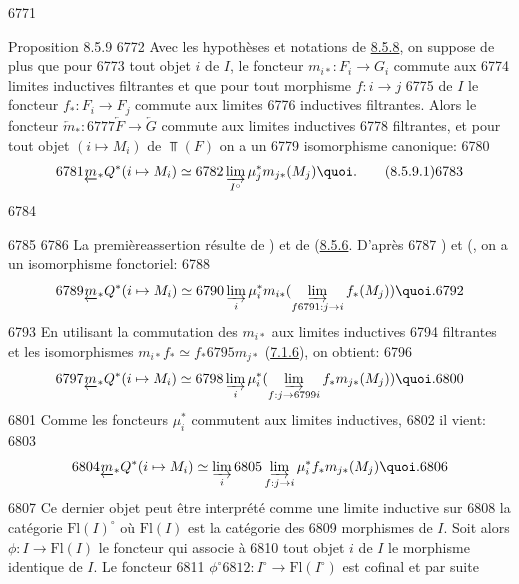   6771	\begin{enonce*}{Proposition 8.5.9}
  6772	Avec les hypothèses et notations de \hyperref[VI.prop8.5.8]{8.5.8}, on suppose de plus que pour
  6773	tout objet $i$ de $I$, le foncteur $m_{i\ast} : F_{i} \to G_i$ commute aux
  6774	limites inductives filtrantes et que pour tout morphisme $f : i \to j$
  6775	de $I$ le foncteur $f_{\ast} : F_i \to F_j$ commute aux limites
  6776	inductives filtrantes. Alors le foncteur $\underleftarrow{m}_{\ast} :
  6777	\underleftarrow{F} \to \underleftarrow{G}$ commute aux limites inductives
  6778	filtrantes, et pour tout objet $(i \mapsto M_i)$ de $\Top(F)$ on a un
  6779	isomorphisme canonique:
  6780	\begin{equation*}
  6781	\underleftarrow{m}_{\ast} Q^{\ast} (i \mapsto M_i) \simeq
  6782	\varinjlim_{I^{\circ}} \mu^{\ast}_j m_{j\ast} (M_j){\quoi}.\tag{8.5.9.1}
  6783	\end{equation*}
  6784	\end{enonce*}
  6785	
  6786	La première\pageoriginale assertion résulte de ) et de (\hyperref[VI.cor8.5.6]{8.5.6}. D'après
  6787	) et (, on a un isomorphisme fonctoriel:
  6788	$$
  6789	\underleftarrow{m}_{\ast} Q^{\ast} (i \mapsto M_i) \simeq
  6790	\varinjlim_i \mu^{\ast}_{i} m_{i\ast} (\varinjlim_{f
  6791	  : j \to i} f_{\ast} (M_{j})){\quoi}.
  6792	$$
  6793	En utilisant la commutation des $m_{i\ast}$ aux limites inductives
  6794	filtrantes et les isomorphismes $m_{i\ast} f_{\ast} \simeq f_{\ast}
  6795	m_{j\ast}$ (\hyperref[VI.subsubsec7.1.6]{7.1.6}), on obtient:
  6796	$$
  6797	\underleftarrow{m}_{\ast} Q^{\ast} (i \mapsto M_i) \simeq
  6798	\varinjlim_i \mu^{\ast}_{i} (\varinjlim_{f : j \to
  6799	  i} f_{\ast} m_{j\ast} (M_j)){\quoi}.
  6800	$$
  6801	Comme les foncteurs $\mu^{\ast}_{i}$ commutent aux limites inductives,
  6802	il vient:
  6803	$$
  6804	\underleftarrow{m}_{\ast}Q^{\ast}(i\mapsto M_{i})\simeq \varinjlim_{i}
  6805	\varinjlim_{f:j\to i} \mu^{\ast}_{i}f_{\ast}m_{j\ast}(M_{j}){\quoi}.
  6806	$$
  6807	Ce dernier objet peut être interprété comme une limite inductive sur
  6808	la catégorie $\text{Fl}(I)^{\circ}$ où $\text{Fl}(I)$ est la catégorie des
  6809	morphismes de $I$. Soit alors $\phi : I \to \text{Fl}(I)$ le foncteur qui associe à
  6810	tout objet $i$ de $I$ le morphisme identique de $I$. Le foncteur
  6811	$\phi^{\circ}
  6812	: I^{\circ} \to \text{Fl}(I^{\circ})$ est cofinal et par suite

